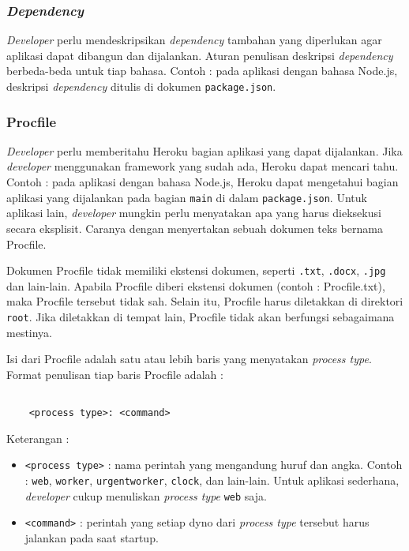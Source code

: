 \subsubsection{\textit{Dependency}}
\textit{Developer} perlu mendeskripsikan \textit{dependency} tambahan yang diperlukan agar aplikasi dapat dibangun dan dijalankan. Aturan penulisan deskripsi \textit{dependency} berbeda-beda untuk tiap bahasa. Contoh : pada aplikasi dengan bahasa Node.js, deskripsi \textit{dependency} ditulis di dokumen \texttt{package.json}.

\subsubsection{Procfile}
\textit{Developer} perlu memberitahu Heroku bagian aplikasi yang dapat dijalankan. Jika \textit{developer} menggunakan framework yang sudah ada, Heroku dapat mencari tahu. Contoh : pada aplikasi dengan bahasa Node.js, Heroku dapat mengetahui bagian aplikasi yang dijalankan pada bagian \texttt{main} di dalam \texttt{package.json}. Untuk aplikasi lain, \textit{developer} mungkin perlu menyatakan apa yang harus dieksekusi secara eksplisit. Caranya dengan menyertakan sebuah dokumen teks bernama Procfile. 

Dokumen Procfile tidak memiliki ekstensi dokumen, seperti \texttt{.txt}, \texttt{.docx}, \texttt{.jpg} dan lain-lain. Apabila Procfile diberi ekstensi dokumen (contoh : Procfile.txt), maka Procfile tersebut tidak sah. Selain itu, Procfile harus diletakkan di direktori \texttt{root}. Jika diletakkan di tempat lain, Procfile tidak akan berfungsi sebagaimana mestinya.

Isi dari Procfile adalah satu atau lebih baris yang menyatakan \textit{process type}. Format penulisan tiap baris Procfile adalah : 
\begin{lstlisting}

	<process type>: <command>

\end{lstlisting}
Keterangan :
\begin{itemize}
\item \texttt{<process type>} : nama perintah yang mengandung huruf dan angka. Contoh : \texttt{web}, \texttt{worker}, \texttt{urgentworker}, \texttt{clock}, dan lain-lain. Untuk aplikasi sederhana, \textit{developer} cukup menuliskan \textit{process type} \texttt{web} saja.
\item \texttt{<command>} : perintah yang setiap dyno dari \textit{process type} tersebut harus jalankan pada saat startup.
\end{itemize}
 
